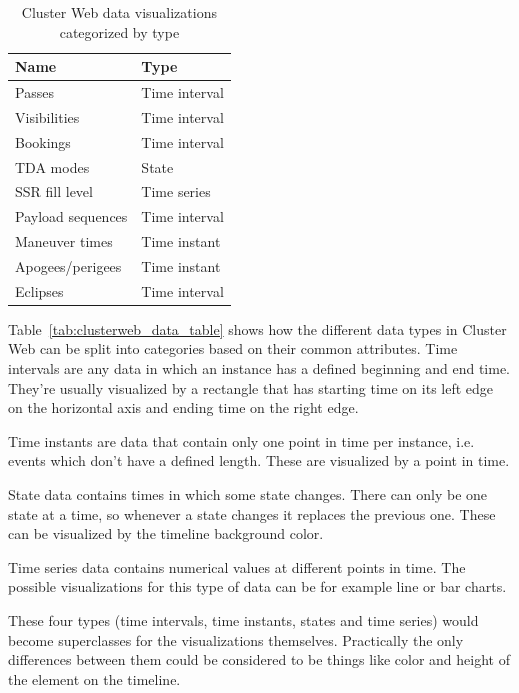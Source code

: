 \begin{table}[!ht]
\def\arraystretch{1.1}%
\begin{center}
  \caption{Cluster Web data visualizations categorized by type}
  \label{tab:clusterweb_data_types_table}
  \begin{tabular}{| l | l | }
    \hline
    Name & Type \\
    \hline
    Passes & Time interval \\
    Visibilities & Time interval \\
    Bookings & Time interval  \\
    TDA modes & State \\
    SSR fill level & Time series \\
    Payload sequences & Time interval \\
    Maneuver times & Time instant \\
    Apogees/perigees & Time instant \\
    Eclipses & Time interval \\
    \hline
  \end{tabular}

  \end{center}
\end{table}

Table~\ref{tab:clusterweb_data_table} shows how the different data types in Cluster Web can be split into categories based on their common attributes. Time intervals are any data in which an instance has a defined beginning and end time. They're usually visualized by a rectangle that has starting time on its left edge on the horizontal axis and ending time on the right edge.

Time instants are data that contain only one point in time per instance, i.e. events which don't have a defined length. These are visualized by a point in time.

State data contains times in which some state changes. There can only be one state at a time, so whenever a state changes it replaces the previous one. These can be visualized by the timeline background color.

Time series data contains numerical values at different points in time. The possible visualizations for this type of data can be for example line or bar charts.

These four types (time intervals, time instants, states and time series) would become superclasses for the visualizations themselves. Practically the only differences between them could be considered to be things like color and height of the element on the timeline.